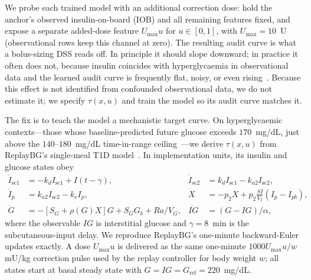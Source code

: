 \documentclass[a4paper,fleqn]{cas-sc}
\begin{document}
We probe each trained model with an additional correction dose: hold the
anchor's observed insulin-on-board (IOB) and all remaining features fixed,
and expose a separate added-dose feature $U_{\max}u$ for $u\in[0,1]$, with
$U_{\max}=10$~U (observational rows keep this channel at zero). The resulting
audit curve is what a bolus-sizing DSS reads off. In principle it
should slope downward; in practice it often does not, because insulin coincides
with hyperglycaemia in observational data and the learned audit curve is
frequently flat, noisy, or even
rising~\citep{bergman1979,cobelli2009,prendin2023}. Because this effect is not
identified from confounded observational data, we do not estimate it; we
specify $\tau(x,u)$ and train the model so its audit curve matches it.

The fix is to teach the model a mechanistic target curve. On hyperglycaemic
contexts---those whose baseline-predicted future glucose exceeds $170$~mg/dL,
just above the $140$--$180$~mg/dL time-in-range
ceiling~\citep{battelino2019}---we derive $\tau(x,u)$ from ReplayBG's
single-meal T1D model~\citep{cappon2023}.\label{subsec:target}
In implementation units, its insulin and glucose states obey
\begin{equation}
\begin{aligned}
\dot I_{\mathrm{sc1}}&=-k_d I_{\mathrm{sc1}}+I(t-\gamma),&
\dot I_{\mathrm{sc2}}&=k_d I_{\mathrm{sc1}}-k_{a2}I_{\mathrm{sc2}},\\
\dot I_p&=k_{a2}I_{\mathrm{sc2}}-k_eI_p,&
\dot X&=-p_2X+p_2\frac{SI}{V_I}(I_p-I_{pb}),\\
\dot G&=-[S_G+\rho(G)X]G+S_GG_b+Ra/V_G,&
\dot{IG}&=(G-IG)/\alpha ,
\end{aligned}
\label{eq:replay-insulin}
\end{equation}
where the observable $IG$ is interstitial glucose and $\gamma=8$~min is the
subcutaneous-input delay. We reproduce ReplayBG's one-minute backward-Euler
updates exactly. A dose $U_{\max}u$ is delivered as the same one-minute
$1000U_{\max}u/w$ mU/kg correction pulse used by the replay controller for
body weight $w$; all states start at basal steady state with
$G=IG=G_{\mathrm{ref}}=220$~mg/dL.
\end{document}
